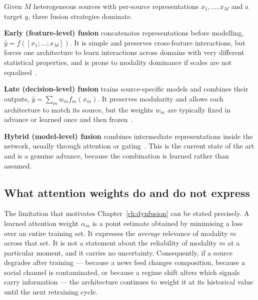 Given $M$ heterogeneous sources with per-source representations $x_1, \dots, x_M$ and a target
$y$, three fusion strategies dominate.

\textbf{Early (feature-level) fusion} concatenates representations before modelling,
$\hat{y} = f([x_1; \dots; x_M])$. It is simple and preserves cross-feature interactions, but
forces one architecture to learn interactions across domains with very different statistical
properties, and is prone to modality dominance if scales are not equalised~\cite{moodi2024}.

\textbf{Late (decision-level) fusion} trains source-specific models and combines their outputs,
$\hat{y} = \sum_m w_m f_m(x_m)$. It preserves modularity and allows each architecture to match
its source, but the weights $w_m$ are typically fixed in advance or learned once and then
frozen~\cite{farimani2024,vargas2022}.

\textbf{Hybrid (model-level) fusion} combines intermediate representations inside the network,
usually through attention or gating~\cite{liu2019attention,haryono2023,zong2025}. This is the
current state of the art and is a genuine advance, because the combination is learned rather
than assumed.

\subsection{What attention weights do and do not express}

The limitation that motivates Chapter~\ref{ch:dynfusion} can be stated precisely. A learned
attention weight $\alpha_m$ is a point estimate obtained by minimising a loss over an entire
training set. It expresses the \emph{average} relevance of modality $m$ across that set. It is
not a statement about the reliability of modality $m$ at a particular moment, and it carries no
uncertainty. Consequently, if a source degrades after training --- because a news feed changes
composition, because a social channel is contaminated, or because a regime shift alters which
signals carry information --- the architecture continues to weight it at its historical value
until the next retraining cycle.

